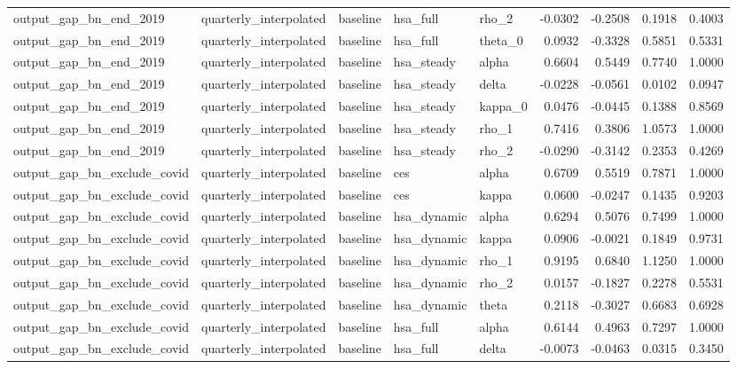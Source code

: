 \begin{tabular}{lllllrrrr}
output\_gap\_bn\_end\_2019 & quarterly\_interpolated & baseline & hsa\_full & rho\_2 & -0.0302 & -0.2508 & 0.1918 & 0.4003 \\
output\_gap\_bn\_end\_2019 & quarterly\_interpolated & baseline & hsa\_full & theta\_0 & 0.0932 & -0.3328 & 0.5851 & 0.5331 \\
output\_gap\_bn\_end\_2019 & quarterly\_interpolated & baseline & hsa\_steady & alpha & 0.6604 & 0.5449 & 0.7740 & 1.0000 \\
output\_gap\_bn\_end\_2019 & quarterly\_interpolated & baseline & hsa\_steady & delta & -0.0228 & -0.0561 & 0.0102 & 0.0947 \\
output\_gap\_bn\_end\_2019 & quarterly\_interpolated & baseline & hsa\_steady & kappa\_0 & 0.0476 & -0.0445 & 0.1388 & 0.8569 \\
output\_gap\_bn\_end\_2019 & quarterly\_interpolated & baseline & hsa\_steady & rho\_1 & 0.7416 & 0.3806 & 1.0573 & 1.0000 \\
output\_gap\_bn\_end\_2019 & quarterly\_interpolated & baseline & hsa\_steady & rho\_2 & -0.0290 & -0.3142 & 0.2353 & 0.4269 \\
output\_gap\_bn\_exclude\_covid & quarterly\_interpolated & baseline & ces & alpha & 0.6709 & 0.5519 & 0.7871 & 1.0000 \\
output\_gap\_bn\_exclude\_covid & quarterly\_interpolated & baseline & ces & kappa & 0.0600 & -0.0247 & 0.1435 & 0.9203 \\
output\_gap\_bn\_exclude\_covid & quarterly\_interpolated & baseline & hsa\_dynamic & alpha & 0.6294 & 0.5076 & 0.7499 & 1.0000 \\
output\_gap\_bn\_exclude\_covid & quarterly\_interpolated & baseline & hsa\_dynamic & kappa & 0.0906 & -0.0021 & 0.1849 & 0.9731 \\
output\_gap\_bn\_exclude\_covid & quarterly\_interpolated & baseline & hsa\_dynamic & rho\_1 & 0.9195 & 0.6840 & 1.1250 & 1.0000 \\
output\_gap\_bn\_exclude\_covid & quarterly\_interpolated & baseline & hsa\_dynamic & rho\_2 & 0.0157 & -0.1827 & 0.2278 & 0.5531 \\
output\_gap\_bn\_exclude\_covid & quarterly\_interpolated & baseline & hsa\_dynamic & theta & 0.2118 & -0.3027 & 0.6683 & 0.6928 \\
output\_gap\_bn\_exclude\_covid & quarterly\_interpolated & baseline & hsa\_full & alpha & 0.6144 & 0.4963 & 0.7297 & 1.0000 \\
output\_gap\_bn\_exclude\_covid & quarterly\_interpolated & baseline & hsa\_full & delta & -0.0073 & -0.0463 & 0.0315 & 0.3450 \\

\end{tabular}
